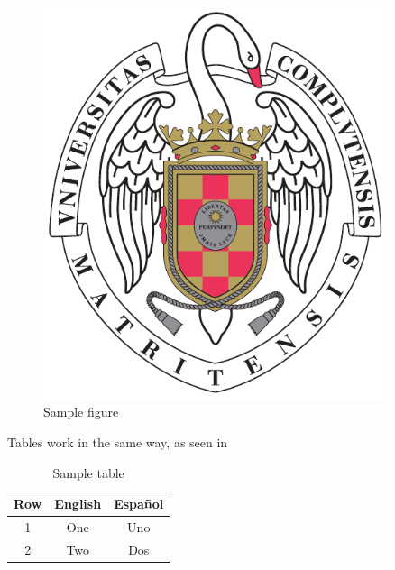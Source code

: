		\begin{figure}[h!]
			\centering
			\includegraphics[width=0.9\textwidth]{./Images/escudo_ucm.pdf}
			\caption{Sample figure}
			\label{fig:logo_ucm}
		\end{figure}

		Tables work in the same way, as seen in 

		\begin{table}[h!]
			\centering
			\begin{tabular}{c|c|c}
				Row & English & Español \\\hline\hline
				1 & One & Uno \\
				2 & Two & Dos \\
			\end{tabular}
			\caption{Sample table}
			\label{tab:tabla}
		\end{table}